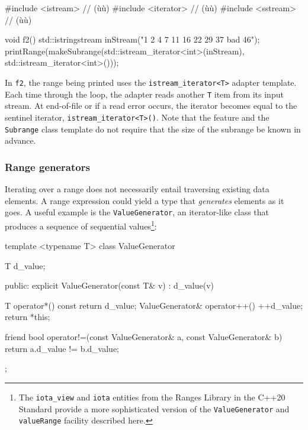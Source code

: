 {{\begin{emcppslisting}[emcppsbatch=e2]
#include <istream>   // (ù{}ù)
#include <iterator>  // (ù{}ù)
#include <sstream>   // (ù{}ù)

void f2()
{
    std::istringstream inStream("1 2 4 7 11 16 22 29 37 bad 46");
    printRange(makeSubrange(std::istream_iterator<int>(inStream),
                            std::istream_iterator<int>()));
}
\end{emcppslisting}


\noindent In \lstinline!f2!, the range being printed uses the
\lstinline!istream_iterator<T>! adapter template. Each time through the
loop, the adapter reads another \lstinline!T! item from its input stream.
At end-of-file or if a read error occurs, the iterator becomes equal to
the sentinel iterator, \lstinline!istream_iterator<T>()!. Note that the
 feature and the \lstinline!Subrange!
class template do not require that the size of the subrange be known in
advance.

\subsubsection[Range generators]{Range generators}\label{range-generators}

Iterating over a range does not necessarily entail traversing existing
data elements. A range expression could yield a type that
\emph{generates} elements as it goes. A useful example is the
\lstinline!ValueGenerator!, an iterator-like class that produces a sequence
of sequential values{\cprotect\footnote{The \lstinline!iota_view! and
\lstinline!iota! entities from the Ranges Library in the C++20 Standard
provide a more sophisticated version of the \lstinline!ValueGenerator!
  and \lstinline!valueRange! facility described here.}}:

\begin{emcppslisting}[emcppsbatch=e2]
template <typename T>
class ValueGenerator
{
    T d_value;

  public:
    explicit ValueGenerator(const T& v) : d_value(v) { }

    T operator*() const { return d_value; }
    ValueGenerator& operator++() { ++d_value; return *this; }

    friend bool operator!=(const ValueGenerator& a, const ValueGenerator& b)
    {
        return a.d_value != b.d_value;
    }
};


\end{emcppslisting}}}
